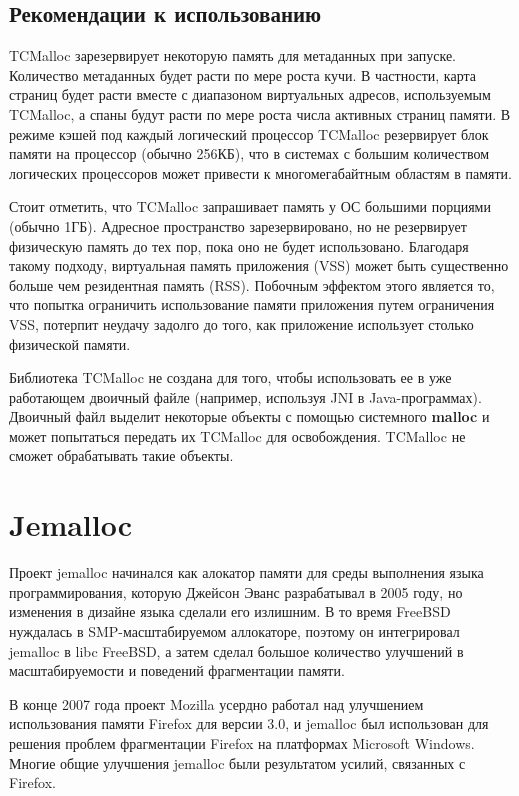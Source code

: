 \subsection{Рекомендации к использованию}

TCMalloc зарезервирует некоторую память для метаданных при запуске. Количество метаданных будет расти по мере роста кучи. В частности, карта страниц будет расти вместе с диапазоном виртуальных адресов, используемым TCMalloc, а спаны будут расти по мере роста числа активных страниц памяти. В режиме кэшей под каждый логический процессор TCMalloc резервирует блок памяти на процессор (обычно 256КБ), что в системах с большим количеством логических процессоров может привести к многомегабайтным областям в памяти.

Стоит отметить, что TCMalloc запрашивает память у ОС большими порциями (обычно 1ГБ). Адресное пространство зарезервировано, но не резервирует физическую память до тех пор, пока оно не будет использовано. Благодаря такому подходу, виртуальная память приложения (VSS) может быть существенно больше чем резидентная память (RSS). Побочным эффектом этого является то, что попытка ограничить использование памяти приложения путем ограничения VSS, потерпит неудачу задолго до того, как приложение использует столько физической памяти.

Библиотека TCMalloc не создана для того, чтобы использовать ее в уже работающем двоичный файле (например, используя JNI в Java-программах). Двоичный файл выделит некоторые объекты с помощью системного \textbf{malloc} и может попытаться передать их TCMalloc для освобождения. TCMalloc не сможет обрабатывать такие объекты.

\section{Jemalloc}
Проект jemalloc начинался как алокатор памяти для среды выполнения языка программирования, которую Джейсон Эванс разрабатывал в 2005 году, но изменения в дизайне языка сделали его излишним. В то время FreeBSD нуждалась в SMP-масштабируемом аллокаторе, поэтому он интегрировал jemalloc в libc FreeBSD, а затем сделал большое количество улучшений в масштабируемости и поведений фрагментации памяти.

В конце 2007 года проект Mozilla усердно работал над улучшением использования памяти Firefox для версии 3.0, и jemalloc был использован для решения проблем фрагментации Firefox на платформах Microsoft Windows. Многие общие улучшения jemalloc были результатом усилий, связанных с Firefox.

